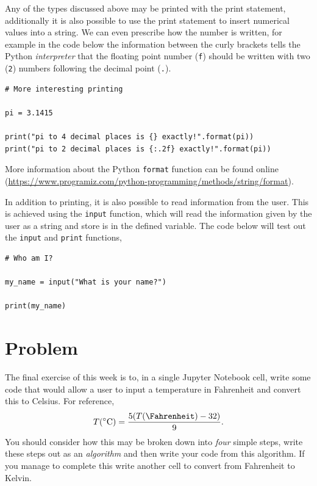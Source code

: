 \documentclass[a4paper]{article}
\begin{document}
Any of the types discussed above may be printed with the print statement, additionally it is also possible to use the print statement to insert numerical values into a string.
We can even prescribe how the number is written, for example in the code below the information between the curly brackets tells the Python \emph{interpreter} that the floating point number (\texttt{f}) should be written with two (\texttt{2}) numbers following the decimal point (\texttt{.}).
\begin{lstlisting}
# More interesting printing

pi = 3.1415

print("pi to 4 decimal places is {} exactly!".format(pi))
print("pi to 2 decimal places is {:.2f} exactly!".format(pi))
\end{lstlisting}
More information about the Python \texttt{format} function can be found online (\url{https://www.programiz.com/python-programming/methods/string/format}).

In addition to printing, it is also possible to read information from the user.
This is achieved using the \texttt{input} function, which will read the information given by the user as a string and store is in the defined variable.
The code below will test out the \texttt{input} and \texttt{print} functions,
\begin{lstlisting}
# Who am I?

my_name = input("What is your name?")

print(my_name)
\end{lstlisting}

\section{Problem}

The final exercise of this week is to, in a single Jupyter Notebook cell, write some code that would allow a user to input a temperature in Fahrenheit and convert this to Celsius.
For reference,
\begin{equation}
	T (\si{\celsius}) = \frac{5 ( T(\si{\Fahrenheit}) - 32)}{9}.
\end{equation}
You should consider how this may be broken down into \emph{four} simple steps, write these steps out as an \emph{algorithm} and then write your code from this algorithm.
If you manage to complete this write another cell to convert from Fahrenheit to Kelvin.



\end{document}
